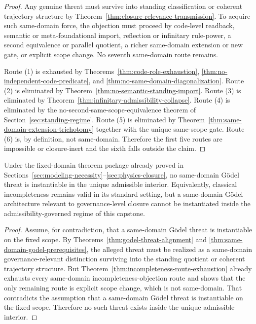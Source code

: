\begin{proof}
Any genuine threat must survive into standing classification or coherent trajectory structure by Theorem~\ref{thm:closure-relevance-transmission}. To acquire such same-domain force, the objection must proceed by code-level readback, semantic or meta-foundational import, reflection or infinitary rule-power, a second equivalence or parallel quotient, a richer same-domain extension or new gate, or explicit scope change. No seventh same-domain route remains.

Route (1) is exhausted by Theorems~\ref{thm:code-role-exhaustion}, \ref{thm:no-independent-code-predicate}, and \ref{thm:no-same-domain-diagonalization}. Route (2) is eliminated by Theorem~\ref{thm:no-semantic-standing-import}. Route (3) is eliminated by Theorem~\ref{thm:infinitary-admissibility-collapse}. Route (4) is eliminated by the no-second-same-scope-equivalence theorem of Section~\ref{sec:standing-regime}. Route (5) is eliminated by Theorem~\ref{thm:same-domain-extension-trichotomy} together with the unique same-scope gate. Route (6) is, by definition, not same-domain. Therefore the first five routes are impossible or closure-inert and the sixth falls outside the claim.
\end{proof}

\begin{theorem}
\label{thm:godel-non-instantiability}
Under the fixed-domain theorem package already proved in Sections~\ref{sec:modeling-necessity}--\ref{sec:physics-closure}, no same-domain G\"odel threat is instantiable in the unique admissible interior. Equivalently, classical incompleteness remains valid in its standard setting, but a same-domain G\"odel architecture relevant to governance-level closure cannot be instantiated inside the admissibility-governed regime of this capstone.
\end{theorem}

\begin{proof}
Assume, for contradiction, that a same-domain G\"odel threat is instantiable on the fixed scope. By Theorems~\ref{thm:godel-threat-alignment} and \ref{thm:same-domain-godel-prerequisites}, the alleged threat must be realized as a same-domain governance-relevant distinction surviving into the standing quotient or coherent trajectory structure. But Theorem~\ref{thm:incompleteness-route-exhaustion} already exhausts every same-domain incompleteness-objection route and shows that the only remaining route is explicit scope change, which is not same-domain. That contradicts the assumption that a same-domain G\"odel threat is instantiable on the fixed scope. Therefore no such threat exists inside the unique admissible interior.
\end{proof}

